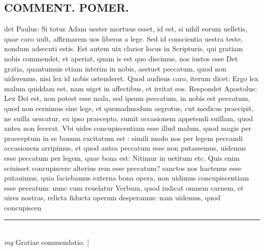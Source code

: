\documentclass{article}
\begin{document}
\begin{pages}
\section*{COMMENT. POMER.  }\pstart det Paulus: Si totus Adam uester mortuus esset, id est, si nihil eorum uelletis, quae caro uult, affirmarem uos liberos a lege. Sed id conscientia uestra teste, nondum adsecuti estis. Est autem uix clarior locus in Scripturis, qui gratiam nobis commendet, et aperiat, quam is est quo discimus, nos iustos esse Det gratia, quantumuis etiam interim in nobis, aestuet peccatum, quod non uideremus, nisi lex id nobis ostenderet. Quod audiens caro, iterum dicet: Ergo lex malum quiddam est, nam uiget in affectibus, et irritat eos. Respondet Apostolus: Lex Dei est, non potest esse mala, sed ipsum peccatum, in nobis est peccatum, quod non cernimus sine lege, et quemadmodum aegrotus, cut medicus praecipit, ne suilla uescatur, ex ipso praecepto, sumit occasionem appetendi suillam, quod antea non fecerat. Vbi uides concupiscentiam esse illud malum, quod magis per praeceptum in se bonum excitatum est : simili modo nos per legem peccandi occasionem arripimus, et quod antea peccatum esse non putassemus, uidemus esse peccatum per legem, quae bona est: Nitimur in uetitum etc. Quis enim sciuisset concupiscere alterius rem esse peccatum? sanctos nos hactenus esse putauimus, quia faciebamus externa bona opera, non uidimus concupiscentiam esse peceatum: nunc cum reuelatur Verbum, quod iudicat omnem carnem, et uires nostras, relicta fiducta operum desperamus: nam uidemus, quod ooncupiscen\pend
\vspace{0.5cm}\noindent
\vspace{0.2cm}\rule{1cm}{0.2pt}\\ 
\hspace{0.2cm}\textit{mg}
\footnotesize Gratiae commendatio.  
\normalsize| 

\end{pages}
\end{document}
